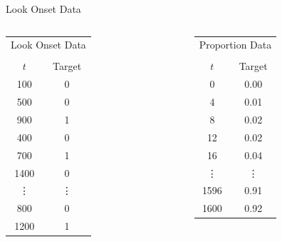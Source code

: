 \documentclass{beamer}
\begin{document}
\begin{frame}{Look Onset Data}


\begin{columns}
\begin{column}{0.45\textwidth}

\begin{table}[ht]
\centering
\begin{tabular}{cc}
\multicolumn{2}{c}{Look Onset Data} \\ 
& \\
  \hline
$t$ & Target \\ 
  \hline
100 &  0 \\ 
  500 &  0 \\ 
  900 &  1 \\ 
  400 &  0 \\ 
  700 &  1 \\ 
  1400 &  0 \\ 
   \vdots & \vdots \\ 
   800 & 0 \\ 
    1200 &  1 \\
   \hline
\end{tabular}
\end{table}


\end{column}
\begin{column}{0.45\textwidth}  %

\begin{table}[ht]
\centering
\begin{tabular}{cc}
\multicolumn{2}{c}{Proportion Data} \\ 
& \\
  \hline
$t$ & Target \\ 
  \hline
  0 & 0.00 \\ 
    4 & 0.01 \\ 
    8 & 0.02 \\ 
   12 & 0.02 \\ 
   16 & 0.04 \\ 
   \vdots & \vdots \\ 
  1596 & 0.91 \\ 
  1600 & 0.92 \\ 
   \hline
\end{tabular}
\end{table}
\end{column}
\end{columns}

\end{frame}
\end{document}
